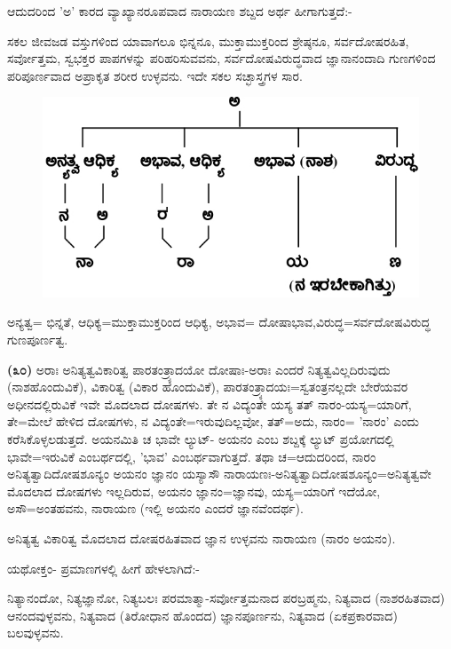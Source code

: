 ಆದುದರಿಂದ 'ಅ' ಕಾರದ ವ್ಯಾಖ್ಯಾನರೂಪವಾದ ನಾರಾಯಣ ಶಬ್ದದ ಅರ್ಥ ಹೀಗಾಗು\-ತ್ತದೆ:-

ಸಕಲ ಜೀವಜಡ ವಸ್ತುಗಳಿಂದ ಯಾವಾಗಲೂ ಭಿನ್ನನೂ, ಮುಕ್ತಾಮುಕ್ತರಿಂದ ಶ್ರೇಷ್ಠನೂ, ಸರ್ವದೋಷರಹಿತ, ಸರ್ವೋತ್ತಮ, ಸ್ವಭಕ್ತರ ಪಾಪಗಳನ್ನು ಪರಿಹರಿಸುವವನು, ಸರ್ವದೋಷವಿರುದ್ಧವಾದ ಜ್ಞಾನಾನಂದಾದಿ ಗುಣಗಳಿಂದ ಪರಿಪೂರ್ಣವಾದ ಅಪ್ರಾಕೃತ ಶರೀರ ಉಳ್ಳವನು. ಇದೇ ಸಕಲ ಸಚ್ಛಾಸ್ತ್ರಗಳ ಸಾರ.

\vspace{-.25cm}

\begin{figure}[!htbp]
\includegraphics[scale=.33]{images/fig1.jpg}
\end{figure}

ಅನ್ಯತ್ವ= ಭಿನ್ನತೆ, ಆಧಿಕ್ಯ=ಮುಕ್ತಾಮುಕ್ತರಿಂದ ಆಧಿಕ್ಯ, ಅಭಾವ= ದೋಷಾಭಾವ,\break ವಿರುದ್ಧ=ಸರ್ವದೋಷವಿರುದ್ಧ ಗುಣಪೂರ್ಣತ್ವ.

\textbf{(೩೦)} ಅರಾಃ ಅನಿತ್ಯತ್ವವಿಕಾರಿತ್ವ ಪಾರತಂತ್ರ್ಯಾದಯೋ ದೋಷಾಃ-ಅರಾಃ ಎಂದರೆ ನಿತ್ಯತ್ವವಿಲ್ಲದಿರುವುದು (ನಾಶಹೊಂದುವಿಕೆ), ವಿಕಾರಿತ್ವ (ವಿಕಾರ ಹೊಂದುವಿಕೆ), ಪಾರತಂತ್ರ್ಯಾ\-ದಯಃ=ಸ್ವತಂತ್ರನಲ್ಲದೇ ಬೇರೆಯವರ ಅಧೀನದಲ್ಲಿರುವಿಕೆ ಇವೇ ಮೊದಲಾದ ದೋಷಗಳು. ತೇ ನ ವಿದ್ಯಂತೇ ಯಸ್ಯ ತತ್ ನಾರಂ-ಯಸ್ಯ=ಯಾರಿಗೆ, ತೇ=ಮೇಲೆ ಹೇಳಿದ ದೋಷಗಳು, ನ ವಿದ್ಯಂತೇ=ಇರುವುದಿಲ್ಲವೋ, ತತ್=ಅದು, ನಾರಂ= 'ನಾರಂ' ಎಂದು ಕರೆಸಿಕೊಳ್ಳಲಡುತ್ತದೆ. ಅಯನಮಿತಿ ಚ ಭಾವೇ ಲ್ಯುಟ್- ಅಯನಂ ಎಂಬ ಶಬ್ದಕ್ಕೆ ಲ್ಯುಟ್ ಪ್ರಯೋಗದಲ್ಲಿ ಭಾವೇ=ಇರುವಿಕೆ ಎಂಬರ್ಥದಲ್ಲಿ, 'ಭಾವ' ಎಂಬರ್ಥವಾಗುತ್ತದೆ. ತಥಾ ಚ=ಆದುದರಿಂದ, ನಾರಂ ಅನಿತ್ಯತ್ವಾದಿದೋಷಶೂನ್ಯಂ ಅಯನಂ ಜ್ಞಾನಂ ಯಸ್ಯಾಸೌ ನಾರಾಯಣಃ-ಅನಿತ್ಯತ್ವಾದಿದೋಷಶೂನ್ಯಂ=ಅನಿತ್ಯತ್ವವೇ ಮೊದಲಾದ ದೋಷಗಳು ಇಲ್ಲದಿರುವ, ಅಯನಂ ಜ್ಞಾನಂ=ಜ್ಞಾನವು, ಯಸ್ಯ=ಯಾರಿಗೆ ಇದೆಯೋ, ಅಸೌ=ಅಂತಹವನು, ನಾರಾಯಣ (ಇಲ್ಲಿ ಅಯನಂ ಎಂದರೆ ಜ್ಞಾನವೆಂದರ್ಥ).

ಅನಿತ್ಯತ್ವ ವಿಕಾರಿತ್ವ ಮೊದಲಾದ ದೋಷರಹಿತವಾದ ಜ್ಞಾನ ಉಳ್ಳವನು ನಾರಾಯಣ (ನಾರಂ ಅಯನಂ).

ಯಥೋಕ್ತಂ- ಪ್ರಮಾಣಗಳಲ್ಲಿ ಹೀಗೆ ಹೇಳಲಾಗಿದೆ:-

ನಿತ್ಯಾನಂದೋ, ನಿತ್ಯಜ್ಞಾನೋ, ನಿತ್ಯಬಲಃ ಪರಮಾತ್ಮಾ-ಸರ್ವೋತ್ತಮನಾದ ಪರಬ್ರಹ್ಮನು, ನಿತ್ಯವಾದ (ನಾಶರಹಿತವಾದ) ಆನಂದವುಳ್ಳವನು, ನಿತ್ಯವಾದ (ತಿರೋಧಾನ ಹೊಂದದ) ಜ್ಞಾನಪೂರ್ಣನು, ನಿತ್ಯವಾದ (ಏಕಪ್ರಕಾರವಾದ) ಬಲವುಳ್ಳವನು.


